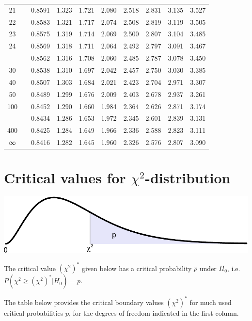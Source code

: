 \documentclass[
]{book}
\begin{document}
\begin{tabular}{cccccccccc}
21 &  & 0.8591 & 1.323 & 1.721 & 2.080 & 2.518 & 2.831 & 3.135 & 3.527\\
22 &  & 0.8583 & 1.321 & 1.717 & 2.074 & 2.508 & 2.819 & 3.119 & 3.505\\
23 &  & 0.8575 & 1.319 & 1.714 & 2.069 & 2.500 & 2.807 & 3.104 & 3.485\\
24 &  & 0.8569 & 1.318 & 1.711 & 2.064 & 2.492 & 2.797 & 3.091 & 3.467\\
\addlinespace
25 &  & 0.8562 & 1.316 & 1.708 & 2.060 & 2.485 & 2.787 & 3.078 & 3.450\\
30 &  & 0.8538 & 1.310 & 1.697 & 2.042 & 2.457 & 2.750 & 3.030 & 3.385\\
40 &  & 0.8507 & 1.303 & 1.684 & 2.021 & 2.423 & 2.704 & 2.971 & 3.307\\
50 &  & 0.8489 & 1.299 & 1.676 & 2.009 & 2.403 & 2.678 & 2.937 & 3.261\\
100 &  & 0.8452 & 1.290 & 1.660 & 1.984 & 2.364 & 2.626 & 2.871 & 3.174\\
\addlinespace
200 &  & 0.8434 & 1.286 & 1.653 & 1.972 & 2.345 & 2.601 & 2.839 & 3.131\\
400 &  & 0.8425 & 1.284 & 1.649 & 1.966 & 2.336 & 2.588 & 2.823 & 3.111\\
∞ &  & 0.8416 & 1.282 & 1.645 & 1.960 & 2.326 & 2.576 & 2.807 & 3.090\\
\bottomrule
\end{tabular}

\hypertarget{app-criticalchi2values}{%
\chapter{\texorpdfstring{Critical values for \(\chi^2\)-distribution}{Critical values for \textbackslash chi\^{}2-distribution}}\label{app-criticalchi2values}}

\includegraphics{QMS-EN_files/figure-latex/criticalchi2values-auxiliaryfigure-1.pdf}

The critical value \((\chi^2)^*\) given below has a critical probability \(p\) under
\(H_0\), i.e.~\(P(\chi^2 \geq (\chi^2)^*|H_0)=p\).

The table below provides the critical boundary values \((\chi^2)^*\) for much used critical probabilities \(p\), for the degrees of freedom indicated in the first column.
\end{document}

